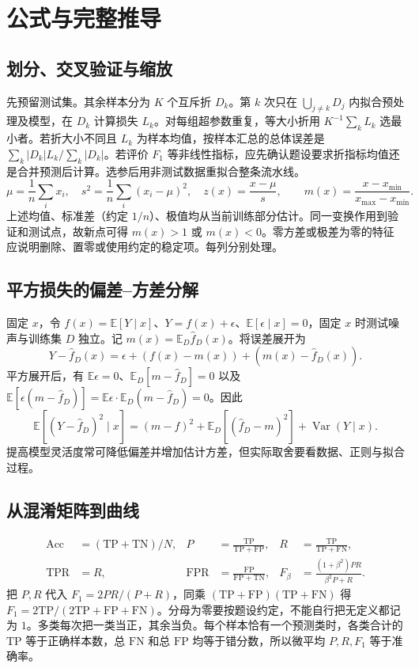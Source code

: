 \documentclass[UTF8,a4paper,zihao=-4,fontset=fandol]{ctexrep}
\begin{document}
\section{公式与完整推导}
\subsection*{划分、交叉验证与缩放}
先预留测试集。其余样本分为 \(K\) 个互斥折 \(D_k\)。第 \(k\) 次只在 \(\bigcup_{j\ne k}D_j\) 内拟合预处理及模型，在 \(D_k\) 计算损失 \(L_k\)。对每组超参数重复，等大小折用 \(K^{-1}\sum_kL_k\) 选最小者。若折大小不同且 \(L_k\) 为样本均值，按样本汇总的总体误差是 \(\sum_k|D_k|L_k/\sum_k|D_k|\)。若评价 \(F_1\) 等非线性指标，应先确认题设要求折指标均值还是合并预测后计算。选参后用非测试数据重拟合整条流水线。
\[
 \mu=\frac1n\sum_i x_i,\quad s^2=\frac1n\sum_i(x_i-\mu)^2,\quad
 z(x)=\frac{x-\mu}{s},\qquad m(x)=\frac{x-x_{\min}}{x_{\max}-x_{\min}}.
\]
上述均值、标准差（约定 \(1/n\)）、极值均从当前训练部分估计。同一变换作用到验证和测试点，故新点可得 \(m(x)>1\) 或 \(m(x)<0\)。零方差或极差为零的特征应说明删除、置零或使用约定的稳定项。每列分别处理。

\subsection*{平方损失的偏差--方差分解}
固定 \(x\)，令 \(f(x)=\mathbb{E}[Y\mid x]\)、\(Y=f(x)+\epsilon\)、\(\mathbb{E}[\epsilon\mid x]=0\)，固定 \(x\) 时测试噪声与训练集 \(D\) 独立。记 \(m(x)=\mathbb{E}_D\hat f_D(x)\)。将误差展开为
\[
 Y-\hat f_D(x)=\epsilon+(f(x)-m(x))+(m(x)-\hat f_D(x)).
\]
平方展开后，有 \(\mathbb{E}\epsilon=0\)、\(\mathbb{E}_D[m-\hat f_D]=0\) 以及 \(\mathbb{E}[\epsilon(m-\hat f_D)]=\mathbb{E}\epsilon\cdot\mathbb{E}_D(m-\hat f_D)=0\)。因此
\[
 \mathbb{E}[(Y-\hat f_D)^2\mid x]
 = (m-f)^2+\mathbb{E}_D[(\hat f_D-m)^2]+\operatorname{Var}(Y\mid x).
\]
提高模型灵活度常可降低偏差并增加估计方差，但实际取舍要看数据、正则与拟合过程。

\subsection*{从混淆矩阵到曲线}
\[
 \begin{aligned}
 \mathrm{Acc}&=(\mathrm{TP}+\mathrm{TN})/N,&
 P&=\frac{\mathrm{TP}}{\mathrm{TP}+\mathrm{FP}},&
 R&=\frac{\mathrm{TP}}{\mathrm{TP}+\mathrm{FN}},\\
 \mathrm{TPR}&=R,&
 \mathrm{FPR}&=\frac{\mathrm{FP}}{\mathrm{FP}+\mathrm{TN}},&
 F_\beta&=\frac{(1+\beta^2)PR}{\beta^2P+R}.
 \end{aligned}
\]
把 \(P,R\) 代入 \(F_1=2PR/(P+R)\)，同乘 \((\mathrm{TP}+\mathrm{FP})(\mathrm{TP}+\mathrm{FN})\) 得 \(F_1=2\mathrm{TP}/(2\mathrm{TP}+\mathrm{FP}+\mathrm{FN})\)。分母为零要按题设约定，不能自行把无定义都记为 \(1\)。多类每次把一类当正，其余当负。每个样本恰有一个预测类时，各类合计的 \(\mathrm{TP}\) 等于正确样本数，总 \(\mathrm{FN}\) 和总 \(\mathrm{FP}\) 均等于错分数，所以微平均 \(P,R,F_1\) 等于准确率。
 
\end{document}
